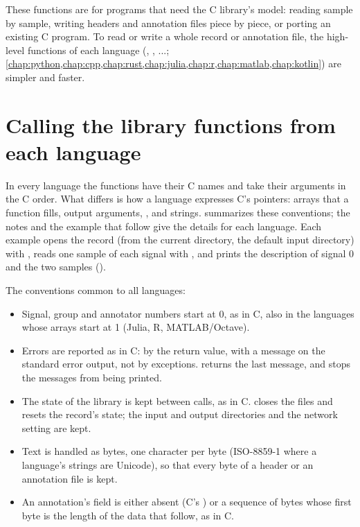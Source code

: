 \begin{note}
These functions are for programs that need the C library's model: reading
sample by sample, writing headers and annotation files piece by piece, or
porting an existing C program. To read or write a whole record or annotation
file, the high-level functions of each language (,
, ...; \cref{chap:python,chap:cpp,chap:rust,chap:julia,chap:r,chap:matlab,chap:kotlin})
are simpler and faster.
\end{note}

\section{Calling the library functions from each language}
\label{sec:library-calling}

In every language the functions have their C names and take their arguments
in the C order. What differs is how a language expresses C's pointers:
arrays that a function fills, output arguments, , and strings.
 summarizes these conventions; the notes and the
example that follow give the details for each language. Each example opens
the record  (from the current directory, the default input
directory) with , reads one sample of each signal with
, and prints the description of signal 0 and the two samples
().

The conventions common to all languages:

\begin{itemize}
\item Signal, group and annotator numbers start at 0, as in C, also in the
  languages whose arrays start at 1 (Julia, R, MATLAB/Octave).
\item Errors are reported as in C: by the return value, with a message on
  the standard error output, not by exceptions.  returns the
  last message, and  stops the messages from being printed.
\item The state of the library is kept between calls, as in C.
   closes the files and resets the record's state; the input
  and output directories and the network setting are kept.
\item Text is handled as bytes, one character per byte (ISO-8859-1 where a
  language's strings are Unicode), so that every byte of a header or an
  annotation file is kept.
\item An annotation's  field is either absent (C's ) or a
  sequence of bytes whose first byte is the length of the data that follow,
  as in C.
\end{itemize}

